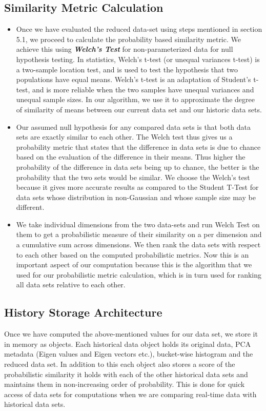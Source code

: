 \subsection{Similarity Metric Calculation}
\label{sim_calc}
\begin{itemize}
    \item Once we have evaluated the reduced data-set using steps mentioned in section 5.1, we proceed to calculate the probability based similarity metric. We achieve this using \textbf{\textit{Welch’s Test}}\cite{welch_test} for non-parameterized data for null hypothesis testing. In statistics, Welch's t-test (or unequal variances t-test) is a two-sample location test, and is used to test the hypothesis that two populations have equal means. Welch's t-test is an adaptation of Student's t-test, and is more reliable when the two samples have unequal variances and unequal sample sizes. In our algorithm, we use it to approximate the degree of similarity of means between our current data set and our historic data sets. 
    \item Our assumed null hypothesis for any compared data sets is that both data sets are exactly similar to each other. The Welch test thus gives us a probability metric that states that the difference in data sets is due to chance based on the evaluation of the difference in their means. Thus higher the probability of the difference in data sets being up to chance, the better is the probability that the two sets would be similar. We choose the Welch's test because it gives more accurate results as compared to the Student T-Test for data sets whose distribution in non-Gaussian and whose sample size may be different.
    \item We take individual dimensions from the two data-sets and run Welch Test on them to get a probabilistic measure of their similarity on a per dimension and a cumulative sum across dimensions. We then rank the data sets with respect to each other based on the computed probabilistic metrics. Now this is an important aspect of our computation because this is the algorithm that we used for our probabilistic metric calculation, which is in turn used for ranking all data sets relative to each other.
\end{itemize}
\subsection{History Storage Architecture}
Once we have computed the above-mentioned values for our data set, we store it in memory as objects. Each historical data object holds its original data, PCA metadata (Eigen values and Eigen vectors etc.), bucket-wise histogram and the reduced data set. In addition to this each object also stores a score of the probabilistic similarity it holds with each of the other historical data sets and maintains them in non-increasing order of probability. This is done for quick access of data sets for computations when we are comparing real-time data with historical data sets.
